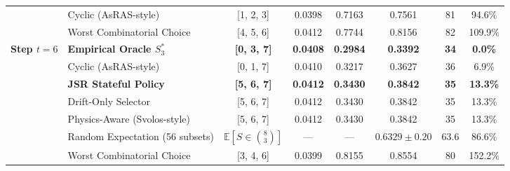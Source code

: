 \documentclass[preprint,12pt,3p]{elsarticle}
\begin{document}
\begin{table}[htbp]
{\begin{tabular}{llcccccc}
& Cyclic (AsRAS-style) & [1, 2, 3] & 0.0398 & 0.7163 & 0.7561 & 81 & 94.6\% \\
& Worst Combinatorial Choice & [4, 5, 6] & 0.0412 & 0.7744 & 0.8156 & 82 & 109.9\% \\
\midrule
\multirow{6}{*}{\textbf{Step $t=6$}} 
& \textbf{Empirical Oracle $S_3^*$} & \textbf{[0, 3, 7]} & \textbf{0.0408} & \textbf{0.2984} & \textbf{0.3392} & \textbf{34} & \textbf{0.0\%} \\
& Cyclic (AsRAS-style) & [0, 1, 7] & 0.0410 & 0.3217 & 0.3627 & 36 & 6.9\% \\
& \textbf{JSR Stateful Policy} & \textbf{[5, 6, 7]} & \textbf{0.0412} & \textbf{0.3430} & \textbf{0.3842} & \textbf{35} & \textbf{13.3\%} \\
& Drift-Only Selector & [5, 6, 7] & 0.0412 & 0.3430 & 0.3842 & 35 & 13.3\% \\
& Physics-Aware (Svolos-style) & [5, 6, 7] & 0.0412 & 0.3430 & 0.3842 & 35 & 13.3\% \\
& Random Expectation (56 subsets) & $\mathbb{E}[S \in \binom{8}{3}]$ & --- & --- & $0.6329 \pm 0.20$ & 63.6 & 86.6\% \\
& Worst Combinatorial Choice & [3, 4, 6] & 0.0399 & 0.8155 & 0.8554 & 80 & 152.2\% \\
\bottomrule
\end{tabular}%
}
\end{table}
\end{document}
